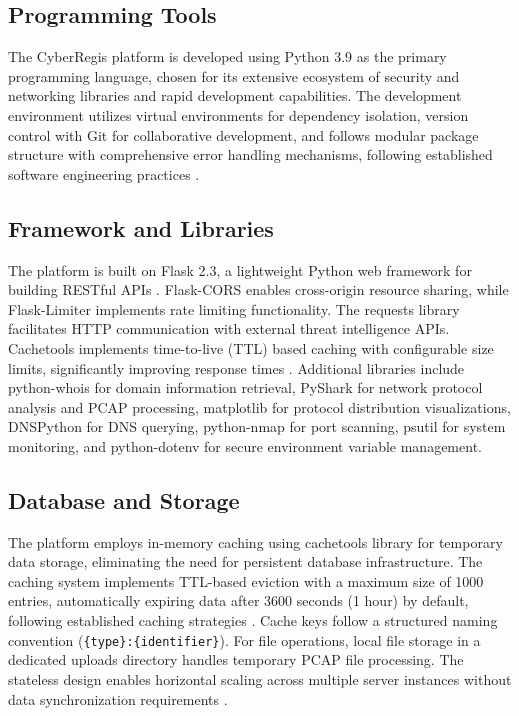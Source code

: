 \documentclass[conference]{IEEEtran}
\begin{document}
\subsection{Programming Tools}

The CyberRegis platform is developed using Python 3.9 as the primary programming language, chosen for its extensive ecosystem of security and networking libraries and rapid development capabilities. The development environment utilizes virtual environments for dependency isolation, version control with Git for collaborative development, and follows modular package structure with comprehensive error handling mechanisms, following established software engineering practices \cite{b20}.

\subsection{Framework and Libraries}

The platform is built on Flask 2.3, a lightweight Python web framework for building RESTful APIs \cite{b7}. Flask-CORS enables cross-origin resource sharing, while Flask-Limiter implements rate limiting functionality. The requests library facilitates HTTP communication with external threat intelligence APIs. Cachetools implements time-to-live (TTL) based caching with configurable size limits, significantly improving response times \cite{b19}. Additional libraries include python-whois for domain information retrieval, PyShark for network protocol analysis and PCAP processing, matplotlib for protocol distribution visualizations, DNSPython for DNS querying, python-nmap for port scanning, psutil for system monitoring, and python-dotenv for secure environment variable management.

\subsection{Database and Storage}

The platform employs in-memory caching using cachetools library for temporary data storage, eliminating the need for persistent database infrastructure. The caching system implements TTL-based eviction with a maximum size of 1000 entries, automatically expiring data after 3600 seconds (1 hour) by default, following established caching strategies \cite{b17,b18}. Cache keys follow a structured naming convention (\texttt{\{type\}:\{identifier\}}). For file operations, local file storage in a dedicated uploads directory handles temporary PCAP file processing. The stateless design enables horizontal scaling across multiple server instances without data synchronization requirements \cite{b7}.
\end{document}
